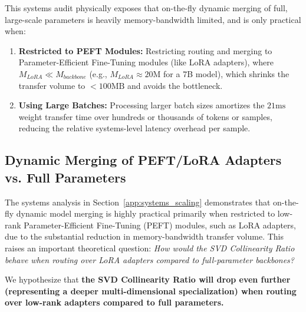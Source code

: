 This systems audit physically exposes that on-the-fly dynamic merging of full, large-scale parameters is heavily memory-bandwidth limited, and is only practical when:
\begin{enumerate}
    \item \textbf{Restricted to PEFT Modules:} Restricting routing and merging to Parameter-Efficient Fine-Tuning modules (like LoRA adapters), where $M_{LoRA} \ll M_{backbone}$ (e.g., $M_{LoRA} \approx 20\text{M}$ for a 7B model), which shrinks the transfer volume to $<100\text{MB}$ and avoids the bottleneck.
    \item \textbf{Using Large Batches:} Processing larger batch sizes amortizes the $21\text{ms}$ weight transfer time over hundreds or thousands of tokens or samples, reducing the relative systems-level latency overhead per sample.
\end{enumerate}

\subsection{Dynamic Merging of PEFT/LoRA Adapters vs. Full Parameters}
\label{app:peft_adapter_collapse_hypothesis}

The systems analysis in Section~\ref{app:systems_scaling} demonstrates that on-the-fly dynamic model merging is highly practical primarily when restricted to low-rank Parameter-Efficient Fine-Tuning (PEFT) modules, such as LoRA adapters, due to the substantial reduction in memory-bandwidth transfer volume. This raises an important theoretical question: \textit{How would the SVD Collinearity Ratio behave when routing over LoRA adapters compared to full-parameter backbones?}

We hypothesize that \textbf{the SVD Collinearity Ratio will drop even further (representing a deeper multi-dimensional specialization) when routing over low-rank adapters compared to full parameters.} 

